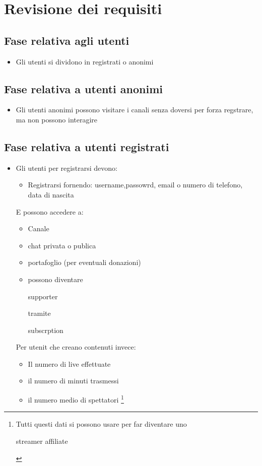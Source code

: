 \section{Revisione dei requisiti}

\subsection{Fase relativa agli utenti}
\begin{itemize}
  \item Gli utenti si dividono in registrati o anonimi
\end{itemize}
\subsection{Fase relativa a utenti anonimi}
\begin{itemize}
  \item Gli utenti anonimi possono visitare i canali senza doversi per 
  forza regstrare, ma non possono interagire 
\end{itemize}
\subsection{Fase relativa a utenti registrati}
\begin{itemize}
  \item Gli utenti per registrarsi devono:
  \begin{itemize}
    \item Registrarsi fornendo: username,passowrd, email o numero di telefono, data di nascita
  \end{itemize}
  E possono accedere a:
    \begin{itemize}
      \item Canale 
      \item chat privata o publica
      \item portafoglio (per eventuali donazioni)
      \item possono diventare \begin{italic}supporter\end{italic} tramite \begin{italic}subscrption\end{italic}
    \end{itemize} 
  Per utenit che creano contenuti invece:
    \begin{itemize}
      \item Il numero di live effettuate 
      \item il numero di minuti trasmessi
      \item il numero medio di spettatori \footnote{Tutti questi dati si possono usare per far diventare uno \begin{italic} streamer affiliate \end{italic} } %
    \end{itemize}
\end{itemize}
